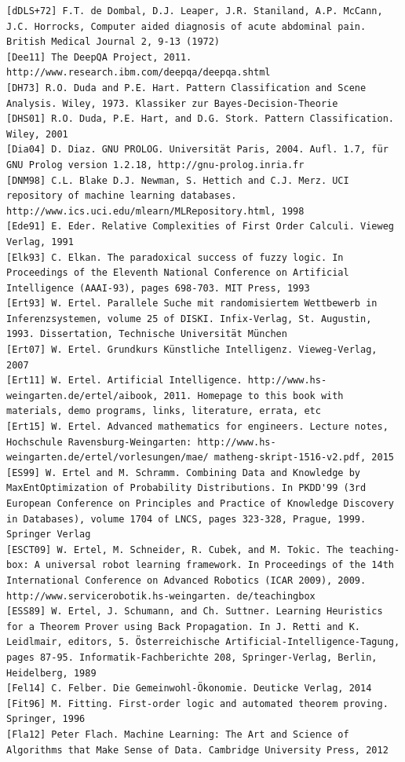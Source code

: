 \documentclass[10pt]{book}
\begin{document}
\begin{center}
\begin{enumerate}
\begin{center}
\begin{center}
\begin{center}
\begin{center}
\begin{center}
\begin{verbatim}
[dDLS+72] F.T. de Dombal, D.J. Leaper, J.R. Staniland, A.P. McCann, J.C. Horrocks, Computer aided diagnosis of acute abdominal pain. British Medical Journal 2, 9-13 (1972)
[Dee11] The DeepQA Project, 2011. http://www.research.ibm.com/deepqa/deepqa.shtml
[DH73] R.O. Duda and P.E. Hart. Pattern Classification and Scene Analysis. Wiley, 1973. Klassiker zur Bayes-Decision-Theorie
[DHS01] R.O. Duda, P.E. Hart, and D.G. Stork. Pattern Classification. Wiley, 2001
[Dia04] D. Diaz. GNU PROLOG. Universität Paris, 2004. Aufl. 1.7, für GNU Prolog version 1.2.18, http://gnu-prolog.inria.fr
[DNM98] C.L. Blake D.J. Newman, S. Hettich and C.J. Merz. UCI repository of machine learning databases. http://www.ics.uci.edu/mlearn/MLRepository.html, 1998
[Ede91] E. Eder. Relative Complexities of First Order Calculi. Vieweg Verlag, 1991
[Elk93] C. Elkan. The paradoxical success of fuzzy logic. In Proceedings of the Eleventh National Conference on Artificial Intelligence (AAAI-93), pages 698-703. MIT Press, 1993
[Ert93] W. Ertel. Parallele Suche mit randomisiertem Wettbewerb in Inferenzsystemen, volume 25 of DISKI. Infix-Verlag, St. Augustin, 1993. Dissertation, Technische Universität München
[Ert07] W. Ertel. Grundkurs Künstliche Intelligenz. Vieweg-Verlag, 2007
[Ert11] W. Ertel. Artificial Intelligence. http://www.hs-weingarten.de/ertel/aibook, 2011. Homepage to this book with materials, demo programs, links, literature, errata, etc
[Ert15] W. Ertel. Advanced mathematics for engineers. Lecture notes, Hochschule Ravensburg-Weingarten: http://www.hs-weingarten.de/ertel/vorlesungen/mae/ matheng-skript-1516-v2.pdf, 2015
[ES99] W. Ertel and M. Schramm. Combining Data and Knowledge by MaxEntOptimization of Probability Distributions. In PKDD'99 (3rd European Conference on Principles and Practice of Knowledge Discovery in Databases), volume 1704 of LNCS, pages 323-328, Prague, 1999. Springer Verlag
[ESCT09] W. Ertel, M. Schneider, R. Cubek, and M. Tokic. The teaching-box: A universal robot learning framework. In Proceedings of the 14th International Conference on Advanced Robotics (ICAR 2009), 2009. http://www.servicerobotik.hs-weingarten. de/teachingbox
[ESS89] W. Ertel, J. Schumann, and Ch. Suttner. Learning Heuristics for a Theorem Prover using Back Propagation. In J. Retti and K. Leidlmair, editors, 5. Österreichische Artificial-Intelligence-Tagung, pages 87-95. Informatik-Fachberichte 208, Springer-Verlag, Berlin, Heidelberg, 1989
[Fel14] C. Felber. Die Gemeinwohl-Ökonomie. Deuticke Verlag, 2014
[Fit96] M. Fitting. First-order logic and automated theorem proving. Springer, 1996
[Fla12] Peter Flach. Machine Learning: The Art and Science of Algorithms that Make Sense of Data. Cambridge University Press, 2012

\end{verbatim}
\end{center}
\end{center}
\end{center}
\end{center}
\end{center}
\end{enumerate}
\end{center}
\end{document}
